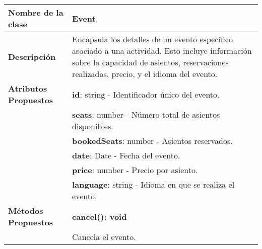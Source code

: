 \begin{clases}
	\centering
\begin{tabular}{|>{\raggedright\arraybackslash}p{4cm}|p{12cm}|}
		\hline
		\textbf{Nombre de la clase}   & \textbf{Event}                                                                                                                                                                              \\
		\hline
		\textbf{Descripción}          & Encapsula los detalles de un evento específico asociado a una actividad. Esto incluye información sobre la capacidad de asientos, reservaciones realizadas, precio, y el idioma del evento. \\
		\hline
		\textbf{Atributos Propuestos} & \textbf{id}: string - Identificador único del evento.                                                                                                                                       \\
		                              & \textbf{seats}: number - Número total de asientos disponibles.                                                                                                                              \\
		                              & \textbf{bookedSeats}: number - Asientos reservados.                                                                                                                                         \\
		                              & \textbf{date}: Date - Fecha del evento.                                                                                                                                                     \\
		                              & \textbf{price}: number - Precio por asiento.                                                                                                                                                \\
		                              & \textbf{language}: string - Idioma en que se realiza el evento.                                                                                                                             \\
		\hline
		\textbf{Métodos Propuestos}   & \textbf{cancel(): void}                                                                                                                                                                     \\
		                              & Cancela el evento.                                                                                                                                                                          \\

\end{tabular}
\end{clases}

